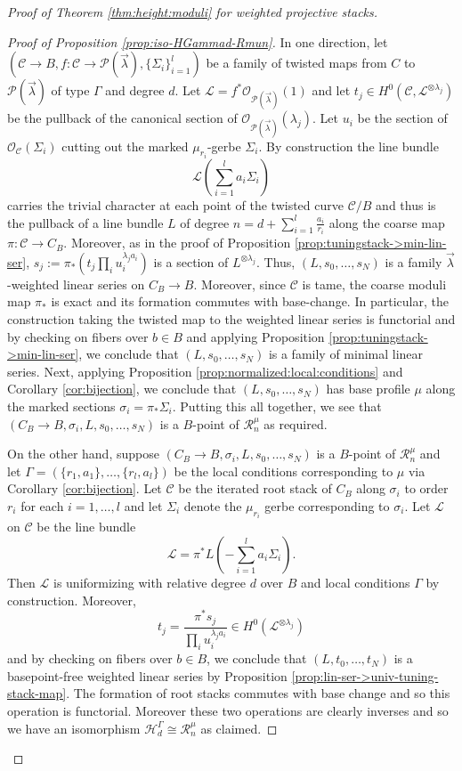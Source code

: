 \documentclass[a4paper,12pt]{amsart}
\theoremstyle{definition}
\newcommand{\cO}{\mathcal{O}}
\newcommand{\cC}{\mathcal{C}}
\newcommand{\cL}{\mathcal{L}}
\newcommand{\cH}{\mathcal{H}}
\newcommand{\cR}{\mathcal{R}}
\newcommand{\Pcv}{\mathcal{P}(\vec{\lambda})}
\newcommand{\lambdavec}{{\vec{\lambda}}}
\begin{document}
\begin{proof}[{Proof of Theorem \ref{thm:height:moduli} for weighted projective stacks}]
		\begin{proof}[Proof of Proposition \ref{prop:iso-HGammad-Rmun}]In one direction, let $(\cC \to B, f : \cC \to \Pcv, \{\Sigma_i\}_{i = 1}^l)$ be a family of twisted maps from $C$ to $\Pcv$ of type $\Gamma$ and degree $d$. Let $\cL = f^*\cO_{\Pcv}(1)$ and let $t_j \in H^0(\cC, \cL^{\otimes \lambda_j})$ be the pullback of the canonical section of $\cO_{\Pcv}(\lambda_j)$. Let $u_i$ be the section of $\cO_{\cC}(\Sigma_i)$ cutting out the marked $\mu_{r_i}$-gerbe $\Sigma_i$. By construction the line bundle
			$$
			\cL\left(\sum_{i = 1}^l a_i \Sigma_i\right) 
			$$
			carries the trivial character at each point of the twisted curve $\cC/B$ and thus is the pullback of a line bundle $L$ of degree $n = d + \sum_{i = 1}^l \frac{a_i}{r_i}$ along the coarse map $\pi : \cC \to C_B$. Moreover, as in the proof of Proposition \ref{prop:tuningstack->min-lin-ser}, $s_j := \pi_*\left(t_j \prod_i u_i^{\lambda_j a_i}\right)$ is a section of $L^{\otimes \lambda_j}$. Thus, $(L, s_0, \ldots, s_N)$ is a family $\lambdavec$-weighted linear series on $C_B \to B$. Moreover, since $\cC$ is tame, the coarse moduli map $\pi_*$ is exact and its formation commutes with base-change. In particular, the construction taking the twisted map to the weighted linear series is functorial and by checking on fibers over $b\in B$ and applying Proposition \ref{prop:tuningstack->min-lin-ser}, we conclude that $(L, s_0, \ldots, s_N)$ is a family of minimal linear series. Next, applying Proposition \ref{prop:normalized:local:conditions} and Corollary \ref{cor:bijection}, we conclude that $(L, s_0, \ldots, s_N)$ has base profile $\mu$ along the marked sections $\sigma_i = \pi_*\Sigma_i$. Putting this all together, we see that $(C_B \to B, \sigma_i, L, s_0, \ldots, s_N)$ is a $B$-point of $\cR^\mu_n$ as required. 
			
			On the other hand, suppose $(C_B \to B, \sigma_i, L, s_0, \ldots, s_N)$ is a $B$-point of $\cR^\mu_n$ and let $\Gamma = \left(\{r_1, a_1\}, \ldots, \{r_l, a_l\}\right)$ be the local conditions corresponding to $\mu$ via Corollary \ref{cor:bijection}. Let $\cC$ be the iterated root stack of $C_B$ along $\sigma_i$ to order $r_i$ for each $i = 1, \ldots, l$ and let $\Sigma_i$ denote the $\mu_{r_i}$ gerbe corresponding to $\sigma_i$. Let $\cL$ on $\cC$ be the line bundle
			$$
			\cL = \pi^*L\left(-\sum_{i=1}^l a_i\Sigma_i\right). 
			$$
			Then $\cL$ is uniformizing with relative degree $d$ over $B$ and local conditions $\Gamma$ by construction. Moreover, 
			$$
			t_j = \frac{\pi^*s_j}{\prod_i u_i^{\lambda_j a_i}} \in H^0(\cL^{\otimes \lambda_j})
			$$
			and by checking on fibers over $b \in B$, we conclude that $(L, t_0, \ldots, t_N)$ is a basepoint-free weighted linear series by Proposition \ref{prop:lin-ser->univ-tuning-stack-map}. The formation of root stacks commutes with base change and so this operation is functorial. Moreover these two operations are clearly inverses and so we have an isomorphism $\cH^\Gamma_d \cong \cR^\mu_n$ as claimed. 
			

\end{proof}
\end{proof}
\end{document}
